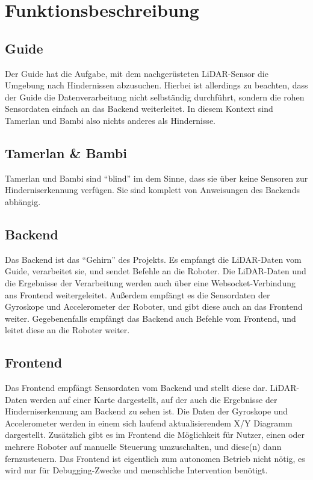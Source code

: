 \section{Funktionsbeschreibung}
\label{subsec:funktionsbeschreibung}

\subsection{Guide}
Der Guide hat die Aufgabe,
mit dem nachgerüsteten LiDAR-Sensor die Umgebung nach Hindernissen abzusuchen.
%
Hierbei ist allerdings zu beachten,
dass der Guide die Datenverarbeitung nicht selbständig durchführt,
sondern die rohen Sensordaten einfach an das Backend weiterleitet.
%
In diesem Kontext sind Tamerlan und Bambi also nichts anderes als Hindernisse.

\subsection{Tamerlan \& Bambi}
Tamerlan und Bambi sind ``blind'' im dem Sinne,
dass sie über keine Sensoren zur Hinderniserkennung verfügen.
%
Sie sind komplett von Anweisungen des Backends abhängig.

\subsection{Backend}
Das Backend ist das ``Gehirn'' des Projekts.
%
Es empfangt die LiDAR-Daten vom Guide,
verarbeitet sie,
und sendet Befehle an die Roboter.
%
Die LiDAR-Daten und die Ergebnisse der Verarbeitung werden auch
über eine Websocket-Verbindung ans Frontend weitergeleitet.
%
Außerdem empfängt es die Sensordaten der Gyroskope und Accelerometer der Roboter,
und gibt diese auch an das Frontend weiter. 
%
Gegebenenfalls empfängt das Backend auch Befehle vom Frontend, und leitet diese an die Roboter weiter.

\subsection{Frontend}
Das Frontend empfängt Sensordaten vom Backend und stellt diese dar.
%
LiDAR-Daten werden auf einer Karte dargestellt,
auf der auch die Ergebnisse der Hinderniserkennung am Backend zu sehen ist.
%
Die Daten der Gyroskope und Accelerometer werden in einem sich laufend aktualisierendem X/Y Diagramm dargestellt.
%
Zusätzlich gibt es im Frontend die Möglichkeit für Nutzer,
einen oder mehrere Roboter auf manuelle Steuerung umzuschalten,
und diese(n) dann fernzusteuern.
%
Das Frontend ist eigentlich zum autonomen Betrieb nicht nötig,
es wird nur für Debugging-Zwecke und menschliche Intervention benötigt.

